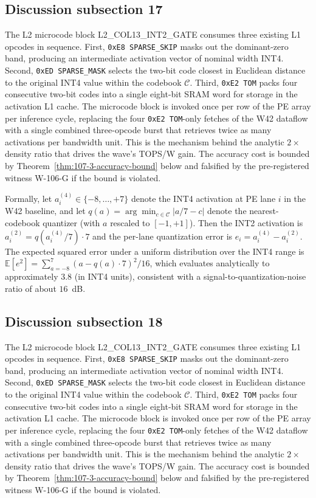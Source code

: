 \subsection{Discussion subsection 17}

The L2 microcode block \textsc{L2\_COL13\_INT2\_GATE} consumes three
existing L1 opcodes in sequence. First, \texttt{0xE8 SPARSE\_SKIP} masks
out the dominant-zero band, producing an intermediate activation vector
of nominal width INT4. Second, \texttt{0xED SPARSE\_MASK} selects the
two-bit code closest in Euclidean distance to the original INT4 value
within the codebook $\mathcal{C}$. Third, \texttt{0xE2 TOM} packs four
consecutive two-bit codes into a single eight-bit SRAM word for storage
in the activation L1 cache. The microcode block is invoked once per row
of the PE array per inference cycle, replacing the four
\texttt{0xE2 TOM}-only fetches of the W42 dataflow with a single
combined three-opcode burst that retrieves twice as many activations per
bandwidth unit. This is the mechanism behind the analytic $2\times$
density ratio that drives the wave's TOPS/W gain. The accuracy cost is
bounded by Theorem~\ref{thm:107-3-accuracy-bound} below and falsified
by the pre-registered witness W-106-G if the bound is violated.

Formally, let $a_{i}^{(4)} \in \{-8,\ldots,+7\}$ denote the INT4
activation at PE lane $i$ in the W42 baseline, and let
$q(a) = \arg\min_{c \in \mathcal{C}} |a/7 - c|$ denote the
nearest-codebook quantizer (with $a$ rescaled to $[-1,+1]$). Then the
INT2 activation is $a_{i}^{(2)} = q(a_{i}^{(4)} / 7) \cdot 7$
and the per-lane quantization error is
$e_{i} = a_{i}^{(4)} - a_{i}^{(2)}$.
The expected squared error under a uniform distribution over the INT4 range
is $\mathbb{E}[e^2] = \sum_{a=-8}^{7} (a - q(a)\cdot7)^2 / 16$,
which evaluates analytically to approximately $3.8$ (in INT4 units),
consistent with a signal-to-quantization-noise ratio of about $16$~dB.


\subsection{Discussion subsection 18}

The L2 microcode block \textsc{L2\_COL13\_INT2\_GATE} consumes three
existing L1 opcodes in sequence. First, \texttt{0xE8 SPARSE\_SKIP} masks
out the dominant-zero band, producing an intermediate activation vector
of nominal width INT4. Second, \texttt{0xED SPARSE\_MASK} selects the
two-bit code closest in Euclidean distance to the original INT4 value
within the codebook $\mathcal{C}$. Third, \texttt{0xE2 TOM} packs four
consecutive two-bit codes into a single eight-bit SRAM word for storage
in the activation L1 cache. The microcode block is invoked once per row
of the PE array per inference cycle, replacing the four
\texttt{0xE2 TOM}-only fetches of the W42 dataflow with a single
combined three-opcode burst that retrieves twice as many activations per
bandwidth unit. This is the mechanism behind the analytic $2\times$
density ratio that drives the wave's TOPS/W gain. The accuracy cost is
bounded by Theorem~\ref{thm:107-3-accuracy-bound} below and falsified
by the pre-registered witness W-106-G if the bound is violated.

